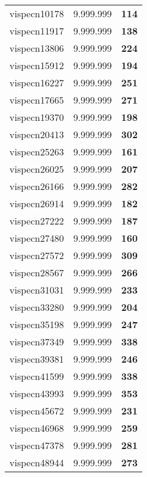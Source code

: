 \begin{tabular}{cc||c}
vispecn10178     & 9.999.999        & {\bf 114}       \\ 
vispecn11917     & 9.999.999        & {\bf 138}       \\ 
vispecn13806     & 9.999.999        & {\bf 224}       \\ 
vispecn15912     & 9.999.999        & {\bf 194}       \\ 
vispecn16227     & 9.999.999        & {\bf 251}       \\ 
vispecn17665     & 9.999.999        & {\bf 271}       \\ 
vispecn19370     & 9.999.999        & {\bf 198}       \\ 
vispecn20413     & 9.999.999        & {\bf 302}       \\ 
vispecn25263     & 9.999.999        & {\bf 161}       \\ 
vispecn26025     & 9.999.999        & {\bf 207}       \\ 
vispecn26166     & 9.999.999        & {\bf 282}       \\ 
vispecn26914     & 9.999.999        & {\bf 182}       \\ 
vispecn27222     & 9.999.999        & {\bf 187}       \\ 
vispecn27480     & 9.999.999        & {\bf 160}       \\ 
vispecn27572     & 9.999.999        & {\bf 309}       \\ 
vispecn28567     & 9.999.999        & {\bf 266}       \\ 
vispecn31031     & 9.999.999        & {\bf 233}       \\ 
vispecn33280     & 9.999.999        & {\bf 204}       \\ 
vispecn35198     & 9.999.999        & {\bf 247}       \\ 
vispecn37349     & 9.999.999        & {\bf 338}       \\ 
vispecn39381     & 9.999.999        & {\bf 246}       \\ 
vispecn41599     & 9.999.999        & {\bf 338}       \\ 
vispecn43993     & 9.999.999        & {\bf 353}       \\ 
vispecn45672     & 9.999.999        & {\bf 231}       \\ 
vispecn46968     & 9.999.999        & {\bf 259}       \\ 
vispecn47378     & 9.999.999        & {\bf 281}       \\ 
vispecn48944     & 9.999.999        & {\bf 273}       \\ 

\end{tabular}
